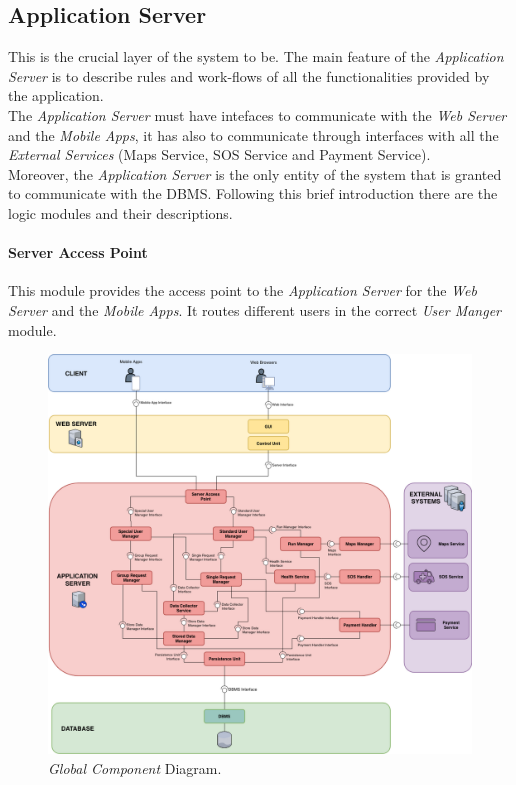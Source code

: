 \subsection{Application Server}
This is the crucial layer of the system to be. The main feature of the \textit{Application Server} is to describe rules and work-flows of all the functionalities provided by the application.\\
The \textit{Application Server} must have intefaces to communicate with the \textit{Web Server} and the \textit{Mobile Apps}, it has also to communicate through interfaces with all the \textit{External Services} (Maps Service, SOS Service and Payment Service).\\
Moreover, the \textit{Application Server} is the only entity of the system that is granted to communicate with the DBMS.
Following this brief introduction there are the logic modules and their descriptions.

\paragraph{Server Access Point}
This module provides the access point to the \textit{Application Server} for the \textit{Web Server} and the \textit{Mobile Apps}. It routes different users in the correct \textit{User Manger} module.

\begin{figure}[H]
  \begin{center}
  	\includegraphics[width=\textwidth]{./img/GlobalComponent.png}
    \hspace{0.05\linewidth}
    \centering
    \caption{\textit{Global Component} Diagram.}
		\label{img:GlobalComponent}
    \end{center}
\end{figure}
